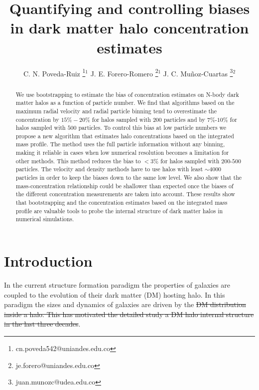 \documentclass{emulateapj}
\providecommand{\DIFadd}[1]{{\protect\color{blue}\uwave{#1}}} %
\providecommand{\DIFdel}[1]{{\protect\color{red}\sout{#1}}}                      %
\providecommand{\DIFaddbegin}{} %
\providecommand{\DIFaddend}{} %
\providecommand{\DIFdelbegin}{} %
\providecommand{\DIFdelend}{} %
\begin{document}
\title{Quantifying and controlling biases in dark matter halo concentration estimates}
\author{
  C. N. Poveda-Ruiz \thanks{cn.poveda542@uniandes.edu.co}$^{1}$
  J. E. Forero-Romero \thanks{je.forero@uniandes.edu.co}$^{1}$
  J. C. Mu\~noz-Cuartas \thanks{juan.munozc@udea.edu.co}$^{2}$
}




\begin{abstract}
We use bootstrapping to estimate the bias of concentration
estimates on N-body dark matter halos as a function of particle
number. 
We find that algorithms based on the maximum radial velocity
and radial particle binning tend to overestimate the concentration by 
$15\%-20\%$ for halos sampled with $200$ particles and by $7\%$-$10\%$
for halos sampled with $500$ particles. 
To control this bias at low particle numbers we propose a new
algorithm that estimates halo concentrations based on the integrated
mass profile.
The method uses the full particle information without any binning,
making it reliable in cases when low numerical resolution becomes a
limitation for other methods.
This method reduces the bias to $< 3\%$ for halos sampled with
$200$-$500$ particles.
The velocity and density methods have to use halos with least $\sim
4000$ particles in order to keep the biases down to the same low
level. 
We also show that the mass-concentration relationship could be
shallower than expected once the biases  of the different
concentration measurements are taken into account. 
These results show that bootstrapping and the concentration estimates
based on the integrated mass profile are valuable tools to probe the
internal structure of dark matter halos in numerical simulations. 
\end{abstract}



\section{Introduction}
\label{sec:introduction}
In the current structure formation paradigm the properties of galaxies
are coupled to the evolution of their dark matter (DM) hosting halo.
In this paradigm the sizes and dynamics of galaxies are driven by
the \DIFdelbegin \DIFdel{DM distribution inside a halo. This has motivated the detailed study
a DM halo internal structure in the last three decades}\DIFdelend \DIFaddbegin \DIFadd{halo internal DM distribution}\DIFaddend . 
\end{document}
